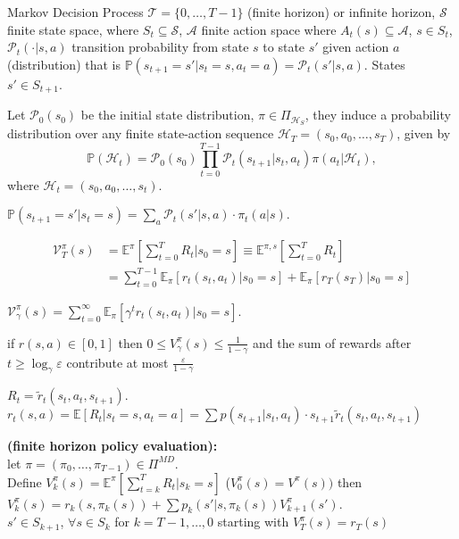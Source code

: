 Markov Decision Process
 $\mathcal{T} = \{0, \ldots, T-1\}$ (finite horizon) or infinite horizon, $\mathcal{S}$ finite state space, where $S_t \subseteq \mathcal{S}$, $\mathcal{A}$ finite action space where $A_t(s) \subseteq \mathcal{A}$, $s \in S_t$, $\mathcal{P}_t(\cdot|s,a)$ transition probability from state $s$ to state $s'$ given action $a$ (distribution) that is $\mathbb{P}(s_{t+1} = s' | s_t = s, a_t = a) = \mathcal{P}_t(s'|s,a)$. States $s' \in S_{t+1}$.

Let $\mathcal{P}_0(s_0)$ be the initial state distribution, $\pi \in \Pi_{\mathcal{H}_S}$, they induce a probability distribution over any finite state-action sequence $\mathcal{H}_T = (s_0, a_0, \ldots, s_T)$, given by
\[\mathbb{P}(\mathcal{H}_t) = \mathcal{P}_0(s_0) \prod_{t=0}^{T-1} \mathcal{P}_t(s_{t+1}|s_t, a_t)\pi(a_t|\mathcal{H}_t),\]
where $\mathcal{H}_t = (s_0, a_0, \ldots, s_t)$.

$\mathbb{P}(s_{t+1} = s' | s_t = s) = \sum_{a} \mathcal{P}_t(s'|s,a) \cdot \pi_t(a|s).$

\begin{align*}
\mathcal{V}_T^\pi(s) &= \mathbb{E}^\pi\left[\sum_{t=0}^{T} R_t | s_0 = s\right] \equiv \mathbb{E}^{\pi  ,s}\left[\sum_{t=0}^{T} R_t\right] \\ &= \sum_{t=0}^{T-1} \mathbb{E}_\pi[r_t(s_t,a_t) | s_0 = s] + \mathbb{E}_\pi[r_T(s_T) | s_0 = s]
\end{align*}


 $ \mathcal{V}_\gamma^\pi(s)  = \sum_{t=0}^\infty \mathbb{E}_\pi[\gamma^t r_t(s_t,a_t) | s_0 = s]$.
\begin{clm} if $r(s, a) \in [0,1]$ then $0 \leq V^{\pi}_{\gamma}(s) \leq \frac{1}{1-\gamma}$ and the sum of rewards after $t \geq \log_{\gamma} \varepsilon$ contribute at most $\frac{\varepsilon}{1-\gamma}$\end{clm}
 $R_t = \tilde{r}_t(s_t, a_t, s_{t+1})$. $r_t(s, a) = \mathbb{E}[R_t|s_t = s, a_t = a] = \sum p(s_{t+1}|s_t, a_t) \cdot s_{t+1}\tilde{r}_t(s_t, a_t, s_{t+1})$
\begin{lem}{\textbf{(finite horizon policy evaluation):}}\\let $\pi = (\pi_0, \dots , \pi_{T-1}) \in \Pi^{MD}$. \\Define $V^{\pi}_k(s) = \mathbb{E}^{\pi}[\sum_{t=k}^{T} R_t|s_k = s]$ ($V^{\pi}_0(s) = V^{\pi}(s))$ then $V^{\pi}_k(s) = r_k(s, \pi_k(s)) + \sum p_k(s'|s, \pi_k(s))V^{\pi}_{k+1} (s')$.\\ $s'\in S_{k+1}$, $\forall s \in S_k$ for $k = T - 1, \dots ,0$ starting with $V^{\pi}_T(s) = r_T(s)$\end{lem}

